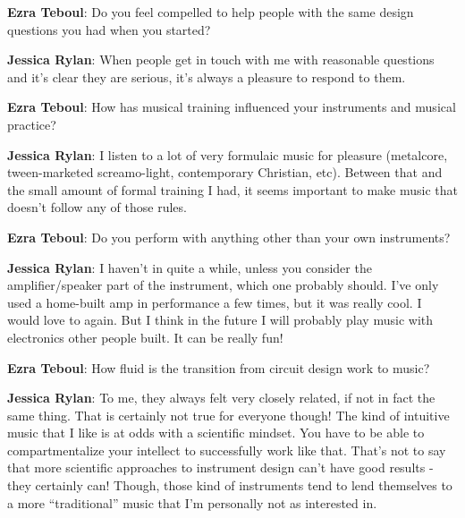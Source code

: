 \textbf{Ezra Teboul}: Do you feel compelled to help people with the same design questions you had when you started? 
                  
\textbf{Jessica Rylan}: When people get in touch with me with reasonable questions and it's clear they are serious, it's always a pleasure to respond to them. 
 
\textbf{Ezra Teboul}: How has musical training influenced your instruments and musical practice? 
                  
\textbf{Jessica Rylan}: I listen to a lot of very formulaic music for pleasure (metalcore, tween-marketed screamo-light, contemporary Christian, etc). Between that and the small amount of formal training I had, it seems important to make music that doesn't follow any of those rules.

\textbf{Ezra Teboul}: Do you perform with anything other than your own instruments? 
                  
\textbf{Jessica Rylan}: I haven't in quite a while, unless you consider the amplifier/speaker part of the instrument, which one probably should. I've only used a home-built amp in performance a few times, but it was really cool. I would love to again. But I think in the future I will probably play music with electronics other people built. It can be really fun!

\textbf{Ezra Teboul}: How fluid is the transition from circuit design work to music?  

\textbf{Jessica Rylan}: To me, they always felt very closely related, if not in fact the same thing. That is certainly not true for everyone though! The kind of intuitive music that I like is at odds with a scientific mindset. You have to be able to compartmentalize your intellect to successfully work like that. That's not to say that more scientific approaches to instrument design can't have good results - they certainly can! Though, those kind of instruments tend to lend themselves to a more ``traditional'' music that I'm personally not as interested in.

\newpage
\clearpage 